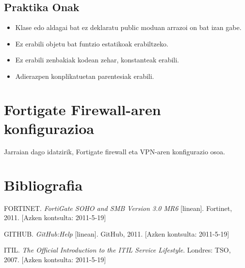 \subsection{Praktika Onak}

  \begin{itemize}
      \item Klase edo aldagai bat ez deklaratu public moduan arrazoi on bat izan gabe.
      \item Ez erabili objetu bat funtzio estatikoak erabiltzeko.
      \item Ez erabili zenbakiak kodean zehar, konstanteak erabili.
      \item Adierazpen konplikatuetan parentesiak erabili.
   \end{itemize}

\section{Fortigate Firewall-aren konfigurazioa}
\label{sec:forkonf}
Jarraian dago idatzirik, Fortigate firewall eta VPN-aren konfigurazio osoa.



\section{Bibliografia}

\noindent FORTINET. \textit{FortiGate SOHO and SMB Version 3.0 MR6} [linean]. Fortinet, 2011. \newline {} [Azken kontsulta: 2011-5-19]
\bigskip

\noindent GITHUB. \textit{GitHub:Help} [linean]. GitHub, 2011. \newline {} [Azken kontsulta: 2011-5-19]
\bigskip

\noindent ITIL. \textit{The Official Introduction to the ITIL Service Lifestyle}. Londres: TSO, 2007. \newline {} [Azken kontsulta: 2011-5-19]
\bigskip

